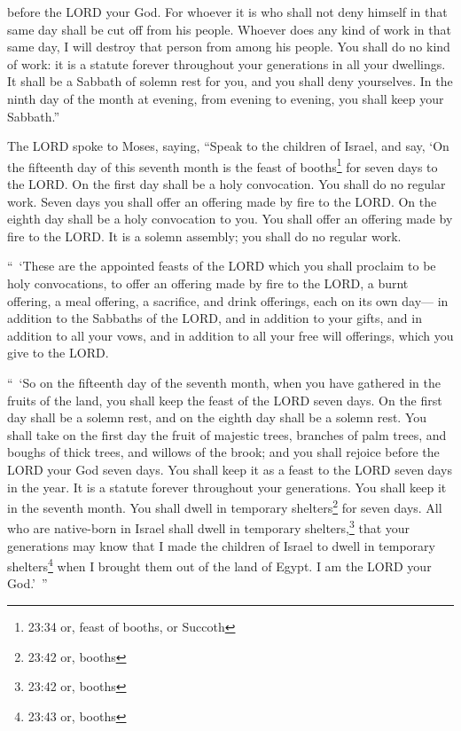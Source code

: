 \noindent before the LORD your God.
\myverse{}For whoever it is who shall not deny himself in that same day shall be cut
off from his people.
\myverse{}Whoever does any kind of work in that same day, I will destroy that person
from among his people.
\myverse{}You shall do no kind of work: it is a statute forever throughout your generations
in all your dwellings.
\myverse{}It shall be a Sabbath of solemn rest for you, and you shall deny yourselves.
In the ninth day of the month at evening, from evening to evening, you shall keep your Sabbath.”


\myverse{}The LORD spoke to Moses, saying,
\myverse{}“Speak to the children of Israel, and say, ‘On the fifteenth day of this
seventh month is the feast of booths\footnote{23:34 or, feast of booths, or Succoth} for seven days to the LORD.
\myverse{}On the first day shall be a holy convocation. You shall do no regular work.
\myverse{}Seven days you shall offer an offering made by fire to the LORD. On the eighth
day shall be a holy convocation to you. You shall offer an offering made by fire to the LORD. It is a
solemn assembly; you shall do no regular work.


\myverse{}“ ‘These are the appointed feasts of the LORD which you shall
proclaim to be holy convocations, to offer an offering made by fire to the LORD, a burnt offering, a meal
offering, a sacrifice, and drink offerings, each on its own day—
\myverse{}in addition to the Sabbaths of the LORD, and in addition to your gifts, and
in addition to all your vows, and in addition to all your free will offerings, which you give to the LORD.


\myverse{}“ ‘So on the fifteenth day of the seventh month, when you have
gathered in the fruits of the land, you shall keep the feast of the LORD seven days. On the first day
shall be a solemn rest, and on the eighth day shall be a solemn rest.
\myverse{}You shall take on the first day the fruit of majestic trees, branches of
palm trees, and boughs of thick trees, and willows of the brook; and you shall rejoice before the LORD
your God seven days.
\myverse{}You shall keep it as a feast to the LORD seven days in the year. It is a
statute forever throughout your generations. You shall keep it in the seventh month.
\myverse{}You shall dwell in temporary shelters\footnote{23:42 or, booths} for seven days. All who are native-born in Israel shall dwell in temporary
shelters,\footnote{23:42 or, booths}
\myverse{}that your generations may know that I made the children of Israel to dwell
in temporary shelters\footnote{23:43 or, booths} when I brought them out of the land of Egypt. I am the LORD your God.’ ”


